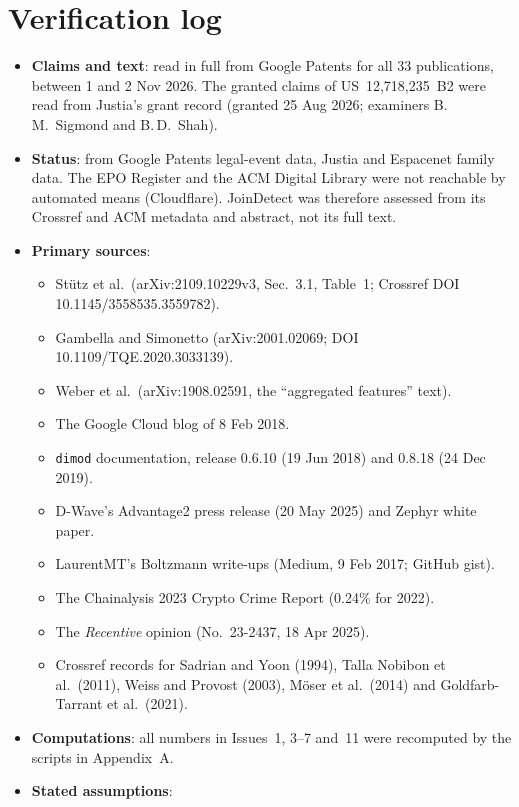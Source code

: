 \documentclass[10pt,a4paper]{article}
\begin{document}
\section{Verification log}
\begin{itemize}
  \item \textbf{Claims and text}: read in full from Google Patents for all 33 publications, between 1 and 2 Nov 2026. The granted claims of US~12,718,235~B2 were read from Justia's grant record (granted 25 Aug 2026; examiners B.\,M.~Sigmond and B.\,D.~Shah).
  \item \textbf{Status}: from Google Patents legal-event data, Justia and Espacenet family data. The EPO Register and the ACM Digital Library were not reachable by automated means (Cloudflare). JoinDetect was therefore assessed from its Crossref and ACM metadata and abstract, not its full text.
  \item \textbf{Primary sources}:
  \begin{itemize}
    \item St\"utz et al.\ (arXiv:2109.10229v3, Sec.~3.1, Table~1; Crossref DOI 10.1145/3558535.3559782).
    \item Gambella and Simonetto (arXiv:2001.02069; DOI 10.1109/TQE.2020.3033139).
    \item Weber et al.\ (arXiv:1908.02591, the ``aggregated features'' text).
    \item The Google Cloud blog of 8 Feb 2018.
    \item \texttt{dimod} documentation, release 0.6.10 (19 Jun 2018) and 0.8.18 (24 Dec 2019).
    \item D-Wave's Advantage2 press release (20 May 2025) and Zephyr white paper.
    \item LaurentMT's Boltzmann write-ups (Medium, 9 Feb 2017; GitHub gist).
    \item The Chainalysis 2023 Crypto Crime Report (0.24\% for 2022).
    \item The \emph{Recentive} opinion (No.~23-2437, 18 Apr 2025).
    \item Crossref records for Sadrian and Yoon (1994), Talla Nobibon et al.\ (2011), Weiss and Provost (2003), M\"oser et al.\ (2014) and Goldfarb-Tarrant et al.\ (2021).
  \end{itemize}
  \item \textbf{Computations}: all numbers in Issues~1, 3--7 and~11 were recomputed by the scripts in Appendix~A.
  \item \textbf{Stated assumptions}:
  \begin{itemize}

\end{itemize}
\end{itemize}
\end{document}
